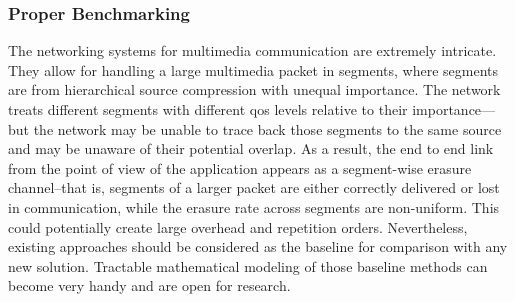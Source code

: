 \subsubsection{Proper Benchmarking}
The networking systems for multimedia communication are extremely intricate. They allow for handling a large multimedia packet in segments, where segments are from hierarchical source compression with unequal importance. The network treats  different segments with different \gls{qos} levels relative to their importance---but the network may be unable to trace back those segments to the same source and may be unaware of their potential overlap. As a result, the end to end link from the point of view of the application appears as a segment-wise erasure channel--that is, segments of a larger packet are either correctly delivered or lost in communication, while the erasure rate across segments are non-uniform. This could potentially create large overhead and repetition orders. Nevertheless, existing approaches should be considered as  the baseline for comparison with any new solution. Tractable mathematical modeling of those baseline methods can become very handy and are open for research.  %


